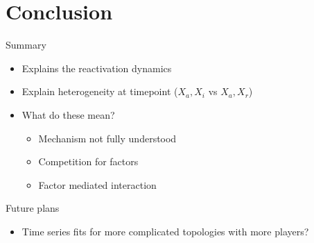 \documentclass[aspectratio=169,9pt]{beamer}
\begin{document}
    \section{Conclusion}

    \begin{frame}{Summary}
        \begin{itemize}
            \item Explains the reactivation dynamics
            \pause \item Explain heterogeneity at timepoint ($X_a,X_i$ vs $X_a,X_r$)
            \pause \item What do these mean?
            \begin{itemize}
                \item Mechanism not fully understood
                \pause \item Competition for factors
                \item Factor mediated interaction
            \end{itemize}
        \end{itemize}
        
    \end{frame}
    
    \begin{frame}{Future plans}
        \begin{itemize}
            \item Time series fits for more complicated topologies with more players?
        \end{itemize}
    \end{frame}

    \begin{frame}[allowframebreaks]
        \printbibliography
    \end{frame}
\end{document}
